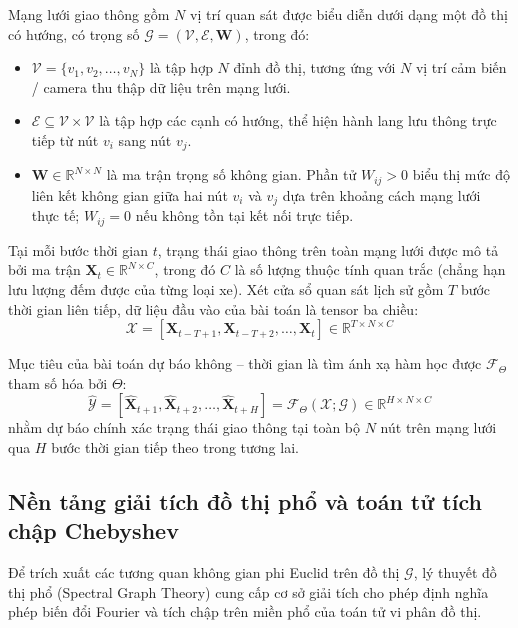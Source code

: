 Mạng lưới giao thông gồm $N$ vị trí quan sát được biểu diễn dưới dạng một đồ thị có hướng, có trọng số $\mathcal{G} = (\mathcal{V}, \mathcal{E}, \mathbf{W})$, trong đó:
\begin{itemize}
    \item $\mathcal{V} = \{v_1, v_2, \dots, v_N\}$ là tập hợp $N$ đỉnh đồ thị, tương ứng với $N$ vị trí cảm biến / camera thu thập dữ liệu trên mạng lưới.
    \item $\mathcal{E} \subseteq \mathcal{V} \times \mathcal{V}$ là tập hợp các cạnh có hướng, thể hiện hành lang lưu thông trực tiếp từ nút $v_i$ sang nút $v_j$.
    \item $\mathbf{W} \in \mathbb{R}^{N \times N}$ là ma trận trọng số không gian. Phần tử $W_{ij} > 0$ biểu thị mức độ liên kết không gian giữa hai nút $v_i$ và $v_j$ dựa trên khoảng cách mạng lưới thực tế; $W_{ij} = 0$ nếu không tồn tại kết nối trực tiếp.
\end{itemize}

Tại mỗi bước thời gian $t$, trạng thái giao thông trên toàn mạng lưới được mô tả bởi ma trận $\mathbf{X}_t \in \mathbb{R}^{N \times C}$, trong đó $C$ là số lượng thuộc tính quan trắc (chẳng hạn lưu lượng đếm được của từng loại xe). Xét cửa sổ quan sát lịch sử gồm $T$ bước thời gian liên tiếp, dữ liệu đầu vào của bài toán là tensor ba chiều:
\begin{equation}
    \mathcal{X} = [\mathbf{X}_{t-T+1}, \mathbf{X}_{t-T+2}, \dots, \mathbf{X}_t] \in \mathbb{R}^{T \times N \times C}
\end{equation}

Mục tiêu của bài toán dự báo không -- thời gian là tìm ánh xạ hàm học được $\mathcal{F}_\Theta$ tham số hóa bởi $\Theta$:
\begin{equation}
    \hat{\mathcal{Y}} = [\hat{\mathbf{X}}_{t+1}, \hat{\mathbf{X}}_{t+2}, \dots, \hat{\mathbf{X}}_{t+H}] = \mathcal{F}_\Theta(\mathcal{X}; \mathcal{G}) \in \mathbb{R}^{H \times N \times C}
\end{equation}
nhằm dự báo chính xác trạng thái giao thông tại toàn bộ $N$ nút trên mạng lưới qua $H$ bước thời gian tiếp theo trong tương lai.

\subsection{Nền tảng giải tích đồ thị phổ và toán tử tích chập Chebyshev}
\label{sec:ly_thuyet_do_thi_pho}

Để trích xuất các tương quan không gian phi Euclid trên đồ thị $\mathcal{G}$, lý thuyết đồ thị phổ (Spectral Graph Theory) cung cấp cơ sở giải tích cho phép định nghĩa phép biến đổi Fourier và tích chập trên miền phổ của toán tử vi phân đồ thị.

